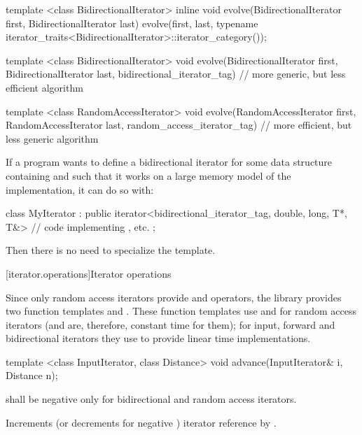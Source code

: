 \begin{codeblock}
template <class BidirectionalIterator>
inline void
evolve(BidirectionalIterator first, BidirectionalIterator last) {
  evolve(first, last,
    typename iterator_traits<BidirectionalIterator>::iterator_category());
}

template <class BidirectionalIterator>
void evolve(BidirectionalIterator first, BidirectionalIterator last,
  bidirectional_iterator_tag) {
  // more generic, but less efficient algorithm
}

template <class RandomAccessIterator>
void evolve(RandomAccessIterator first, RandomAccessIterator last,
  random_access_iterator_tag) {
  // more efficient, but less generic algorithm
}
\end{codeblock}
\exitexample

\pnum
\enterexample
If a \Cpp program wants to define a bidirectional iterator for some data structure containing
and such that it
works on a large memory model of the implementation, it can do so with:

\begin{codeblock}
class MyIterator :
  public iterator<bidirectional_iterator_tag, double, long, T*, T&> {
  // code implementing \tcode{++}, etc.
};
\end{codeblock}

\pnum
Then there is no need to specialize the
template.
\exitexample

[iterator.operations]{Iterator operations}

\pnum
Since only random access iterators provide
\tcode{+}
and
\tcode{-}
operators, the library provides two
function templates
and
.
These
function templates
use
\tcode{+}
and
\tcode{-}
for random access iterators (and are, therefore, constant
time for them); for input, forward and bidirectional iterators they use
\tcode{++}
to provide linear time
implementations.

%
\begin{itemdecl}
template <class InputIterator, class Distance>
  void advance(InputIterator& i, Distance n);
\end{itemdecl}

\begin{itemdescr}
\pnum
\requires
{}
shall be negative only for bidirectional and random access iterators.

\pnum
\effects
Increments (or decrements for negative
)
iterator reference
by
.
\end{itemdescr}


